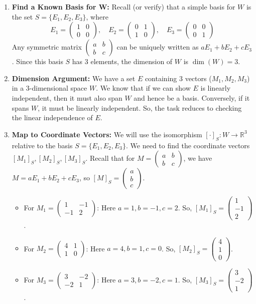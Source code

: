 \documentclass[11pt]{article}
\theoremstyle{definition}
\theoremstyle{remark}
\newcommand{\R}{\mathbb{R}}
\newcommand{\mat}[1]{\begin{pmatrix}#1\end{pmatrix}}
\DeclareMathOperator{\dimn}{dim}
\begin{document}
\begin{enumerate} %
    \item \textbf{Find a Known Basis for W:} Recall (or verify) that a simple basis for $W$ is the set $S = \{E_1, E_2, E_3\}$, where
    \[ E_1 = \mat{1 & 0 \\ 0 & 0}, \quad E_2 = \mat{0 & 1 \\ 1 & 0}, \quad E_3 = \mat{0 & 0 \\ 0 & 1} \]
    Any symmetric matrix $\mat{a & b \\ b & c}$ can be uniquely written as $a E_1 + b E_2 + c E_3$.
    Since this basis $S$ has 3 elements, the dimension of $W$ is $\dimn(W) = 3$.

    \item \textbf{Dimension Argument:} We have a set $E$ containing 3 vectors ($M_1, M_2, M_3$) in a 3-dimensional space $W$. We know that if we can show $E$ is linearly independent, then it must also span $W$ and hence be a basis. Conversely, if it spans $W$, it must be linearly independent. So, the task reduces to checking the linear independence of $E$.

    \item \textbf{Map to Coordinate Vectors:} We will use the isomorphism $[\cdot]_S: W \to \R^3$ relative to the basis $S=\{E_1, E_2, E_3\}$. We need to find the coordinate vectors $[M_1]_S, [M_2]_S, [M_3]_S$.
    Recall that for $M = \mat{a & b \\ b & c}$, we have $M = a E_1 + b E_2 + c E_3$, so $[M]_S = \mat{a \\ b \\ c}$.
    \begin{itemize}
        \item For $M_1 = \mat{1 & -1 \\ -1 & 2}$: Here $a=1, b=-1, c=2$. So, $[M_1]_S = \mat{1 \\ -1 \\ 2}$.
        \item For $M_2 = \mat{4 & 1 \\ 1 & 0}$: Here $a=4, b=1, c=0$. So, $[M_2]_S = \mat{4 \\ 1 \\ 0}$.
        \item For $M_3 = \mat{3 & -2 \\ -2 & 1}$: Here $a=3, b=-2, c=1$. So, $[M_3]_S = \mat{3 \\ -2 \\ 1}$.
    \end{itemize}


\end{enumerate}
\end{document}

